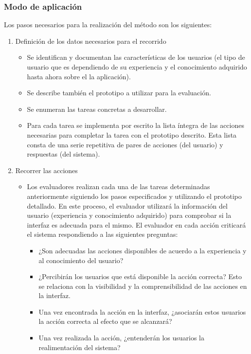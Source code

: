 \subsubsection{Modo de aplicación}
Los pasos necesarios para la realización del método son los siguientes:
\begin{enumerate}
	\item Definición de los datos necesarios para el recorrido
	\begin{itemize}
	    \item Se identifican y documentan las características de los usuarios (el tipo de usuario que es dependiendo de su experiencia y el conocimiento adquirido hasta ahora sobre el la aplicación).
	    \item Se describe también el prototipo a utilizar para la evaluación.
	    \item Se enumeran las tareas concretas a desarrollar.
	    \item Para cada tarea se implementa por escrito la lista íntegra de las acciones necesarias para completar la tarea con el prototipo descrito. Esta lista consta de una serie repetitiva de pares de acciones (del usuario) y respuestas (del sistema).
	\end{itemize}
	\item Recorrer las acciones
	\begin{itemize}
	    \item Los evaluadores realizan cada una de las tareas determinadas anteriormente siguiendo los pasos especificados y utilizando el prototipo detallado. En este proceso, el evaluador utilizará la información del usuario (experiencia y conocimiento adquirido) para comprobar si la interfaz es adecuada para el mismo. El evaluador en cada acción criticará el sistema respondiendo a las siguientes preguntas:
	    \begin{itemize}
	        \item ¿Son adecuadas las acciones disponibles de acuerdo a la experiencia y al conocimiento del usuario?
	        \item ¿Percibirán los usuarios que está disponible la acción correcta? Esto se relaciona con la visibilidad y la comprensibilidad de las acciones en la interfaz. 
	        \item Una vez encontrada la acción en la interfaz, ¿asociarán estos usuarios la acción correcta al efecto que se alcanzará?
	        \item Una vez realizada la acción, ¿entenderán los usuarios la realimentación del sistema?
	    \end{itemize}

\end{itemize}
\end{enumerate}
